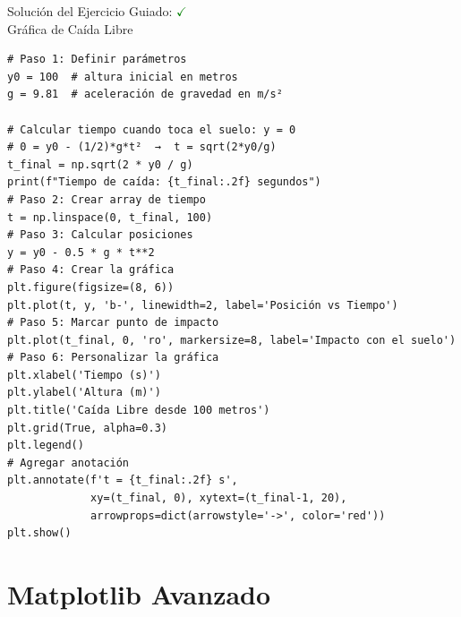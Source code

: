 \documentclass[10pt]{beamer}
\begin{document}
\ifshowsolutions
\begin{frame}[fragile]{Solución del Ejercicio Guiado: \hfill \textcolor{green}{$\checkmark$} \\ Gráfica de Caída Libre}
\begin{verbatim}
# Paso 1: Definir parámetros
y0 = 100  # altura inicial en metros
g = 9.81  # aceleración de gravedad en m/s²

# Calcular tiempo cuando toca el suelo: y = 0
# 0 = y0 - (1/2)*g*t²  →  t = sqrt(2*y0/g)
t_final = np.sqrt(2 * y0 / g)
print(f"Tiempo de caída: {t_final:.2f} segundos")
# Paso 2: Crear array de tiempo
t = np.linspace(0, t_final, 100)
# Paso 3: Calcular posiciones
y = y0 - 0.5 * g * t**2
# Paso 4: Crear la gráfica
plt.figure(figsize=(8, 6))
plt.plot(t, y, 'b-', linewidth=2, label='Posición vs Tiempo')
# Paso 5: Marcar punto de impacto
plt.plot(t_final, 0, 'ro', markersize=8, label='Impacto con el suelo')
# Paso 6: Personalizar la gráfica
plt.xlabel('Tiempo (s)')
plt.ylabel('Altura (m)')
plt.title('Caída Libre desde 100 metros')
plt.grid(True, alpha=0.3)
plt.legend()
# Agregar anotación
plt.annotate(f't = {t_final:.2f} s', 
             xy=(t_final, 0), xytext=(t_final-1, 20),
             arrowprops=dict(arrowstyle='->', color='red'))
plt.show()
\end{verbatim}
\end{frame}
\fi


\section{Matplotlib Avanzado}
\end{document}
